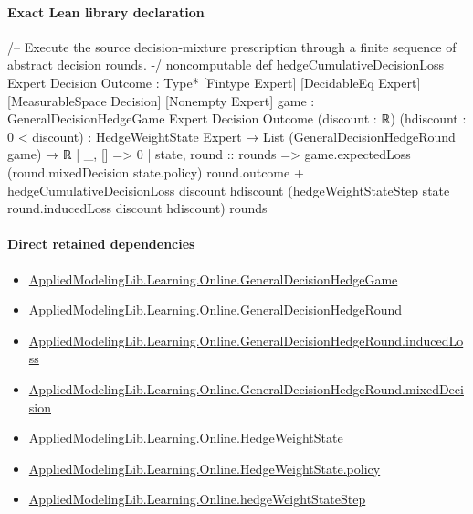 \documentclass[10pt]{article}
\begin{document}
\paragraph{Exact Lean library declaration}
\begin{ReviewVerbatim}
/--
Execute the source decision-mixture prescription through a finite sequence of
abstract decision rounds.
-/
noncomputable def hedgeCumulativeDecisionLoss
    {Expert Decision Outcome : Type*} [Fintype Expert] [DecidableEq Expert]
    [MeasurableSpace Decision]
    [Nonempty Expert] {game : GeneralDecisionHedgeGame Expert Decision Outcome}
    (discount : ℝ) (hdiscount : 0 < discount) :
    HedgeWeightState Expert → List (GeneralDecisionHedgeRound game) → ℝ
  | _, [] => 0
  | state, round :: rounds =>
      game.expectedLoss (round.mixedDecision state.policy) round.outcome +
        hedgeCumulativeDecisionLoss discount hdiscount
          (hedgeWeightStateStep state round.inducedLoss discount hdiscount) rounds
\end{ReviewVerbatim}

\paragraph{Direct retained dependencies}
\begin{itemize}\raggedright
\item \hyperlink{library-prerequisite-34621c1fa332891f}{Applied\allowbreak{}Modeling\allowbreak{}Lib.\allowbreak{}Learning.\allowbreak{}Online.\allowbreak{}General\allowbreak{}Decision\allowbreak{}Hedge\allowbreak{}Game}
\item \hyperlink{library-prerequisite-578531041bcdb501}{Applied\allowbreak{}Modeling\allowbreak{}Lib.\allowbreak{}Learning.\allowbreak{}Online.\allowbreak{}General\allowbreak{}Decision\allowbreak{}Hedge\allowbreak{}Round}
\item \hyperlink{governing-declaration-1d55aa1d8d711074}{Applied\allowbreak{}Modeling\allowbreak{}Lib.\allowbreak{}Learning.\allowbreak{}Online.\allowbreak{}General\allowbreak{}Decision\allowbreak{}Hedge\allowbreak{}Round.\allowbreak{}induced\allowbreak{}Loss}
\item \hyperlink{governing-declaration-33cbcf501ef7c353}{Applied\allowbreak{}Modeling\allowbreak{}Lib.\allowbreak{}Learning.\allowbreak{}Online.\allowbreak{}General\allowbreak{}Decision\allowbreak{}Hedge\allowbreak{}Round.\allowbreak{}mixed\allowbreak{}Decision}
\item \hyperlink{library-prerequisite-8196082d02788389}{Applied\allowbreak{}Modeling\allowbreak{}Lib.\allowbreak{}Learning.\allowbreak{}Online.\allowbreak{}Hedge\allowbreak{}Weight\allowbreak{}State}
\item \hyperlink{governing-declaration-eb2e2e95c87239ee}{Applied\allowbreak{}Modeling\allowbreak{}Lib.\allowbreak{}Learning.\allowbreak{}Online.\allowbreak{}Hedge\allowbreak{}Weight\allowbreak{}State.\allowbreak{}policy}
\item \hyperlink{governing-declaration-f4d506edff5447e0}{Applied\allowbreak{}Modeling\allowbreak{}Lib.\allowbreak{}Learning.\allowbreak{}Online.\allowbreak{}hedge\allowbreak{}Weight\allowbreak{}State\allowbreak{}Step}
\end{itemize}
\end{document}
